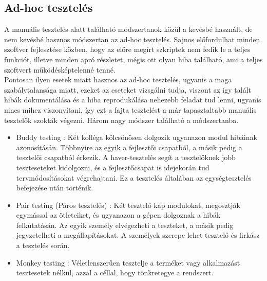 \subsection{Ad-hoc tesztelés} A manuális tesztelés alatt található módszertanok közül a kevésbé használt, de nem kevésbé hasznos módszertan az ad-hoc tesztelés. Sajnos előfordulhat minden szoftver fejlesztése közben, hogy az előre megírt szkriptek nem fedik le a teljes funkciót, illetve minden apró részletet, mégis ott olyan hiba található, ami a teljes szoftvert működésképtelenné tenné.\\ Pontosan ilyen esetek miatt hasznos az ad-hoc tesztelés, ugyanis a maga szabálytalansága miatt, ezeket az eseteket vizsgálni tudja, viszont az így talált hibák dokumentálása és a hiba reprodukálása nehezebb feladat tud lenni, ugyanis nincs mihez viszonyítani, így ezt a fajta tesztelést a már tapasztaltabb manuális tesztelők szokták végezni. Három nagy módszer található a módszertanba.
\begin{itemize}
\item Buddy testing : Két kolléga kölcsönösen dolgozik ugyanazon modul hibáinak azonosításán. Többnyire az egyik a fejlesztői csapatból, a másik pedig a tesztelői csapatból érkezik. A haver-tesztelés segít a tesztelőknek jobb teszteseteket kidolgozni, és a fejlesztőcsapat is idejekorán tud tervmódosításokat végrehajtani. Ez a tesztelés általában az egységtesztelés befejezése után történik\cite{guru99}.
\item Pair testing (Páros tesztelés) : Két tesztelő kap modulokat, megosztják egymással az ötleteiket, és ugyanazon a gépen dolgoznak a hibák felkutatásán. Az egyik személy elvégezheti a teszteket, a másik pedig jegyzetelheti a megállapításokat. A személyek szerepe lehet tesztelő és firkász a tesztelés során\cite{guru99}.
\item Monkey testing : Véletlenszerűen tesztelje a terméket vagy alkalmazást tesztesetek nélkül, azzal a céllal, hogy tönkretegye a rendszert\cite{guru99}.
\end{itemize} 

